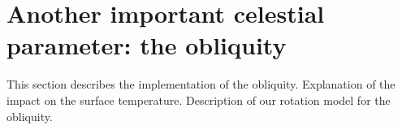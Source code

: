\section{Another important celestial parameter: the obliquity}
\label{obliquity}

This section describes the implementation of the obliquity. Explanation of the impact on the surface temperature. Description of our rotation model for the obliquity.
